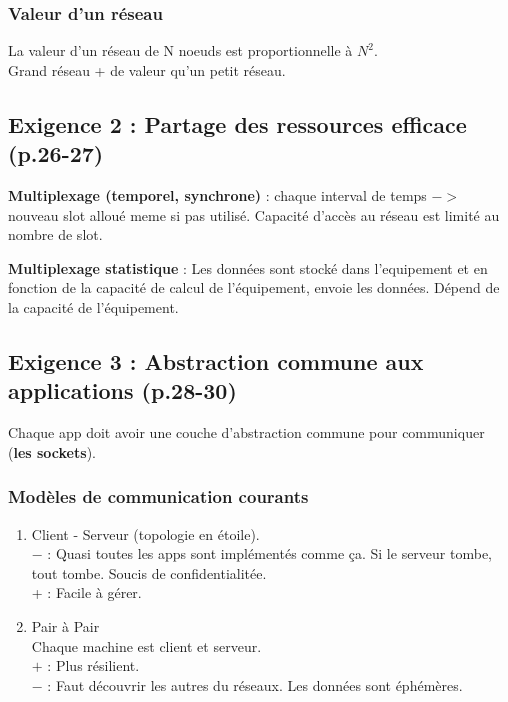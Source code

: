 \documentclass[a4paper, 12pt]{article}
\begin{document}
\subsubsection*{Valeur d'un réseau}
La valeur d'un réseau de N noeuds est proportionnelle à $N^{2}$. \\
Grand réseau + de valeur qu'un petit réseau.

\subsection*{Exigence 2 : Partage des ressources efficace (p.26-27)} 


\textbf{Multiplexage (temporel, synchrone)} : chaque interval de temps $->$ nouveau slot alloué meme si pas utilisé. 
Capacité d'accès au réseau est limité au nombre de slot.

\textbf{Multiplexage statistique} : Les données sont stocké dans l'equipement et en fonction de la capacité de calcul de l'équipement, envoie les données.
Dépend de la capacité de l'équipement.


\subsection*{Exigence 3 : Abstraction commune aux applications (p.28-30)}


Chaque app doit avoir une couche d'abstraction commune pour communiquer (\textbf{les sockets}).

\subsubsection*{Modèles de communication courants}
\begin{enumerate}
    \item   Client - Serveur (topologie en étoile). \\
            $-$ : Quasi toutes les apps sont implémentés comme ça.
            Si le serveur tombe, tout tombe. Soucis de confidentialitée. \\
            + : Facile à gérer.
    \item   Pair à Pair \\
            Chaque machine est client et serveur. \\
            $+$ : Plus résilient. \\
            $-$ : Faut découvrir les autres du réseaux. Les données sont éphémères.
\end{enumerate}
\end{document}
